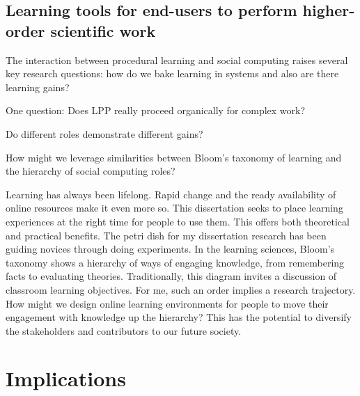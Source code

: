 \subsection{Learning tools for end-users to perform higher-order scientific work}
The interaction between procedural learning and social computing raises several key research questions: how do we bake learning in systems and also are there learning gains?

One question: Does LPP really proceed organically for complex work?

Do different roles demonstrate different gains?

How might we leverage similarities between Bloom’s taxonomy of learning and the hierarchy of social computing roles?

Learning has always been lifelong. Rapid change and the ready availability of online resources make it even more so. This dissertation seeks to place learning experiences at the right time for people to use them. This offers both theoretical and practical benefits. The petri dish for my dissertation research has been guiding novices through doing experiments. In the learning sciences, Bloom’s taxonomy shows a hierarchy of ways of engaging knowledge, from remembering facts to evaluating theories. Traditionally, this diagram invites a discussion of classroom learning objectives. For me, such an order implies a research trajectory. How might we design online learning environments for people to move their engagement with knowledge up the hierarchy? This has the potential to diversify the stakeholders and contributors to our future society. 









\section{Implications}

